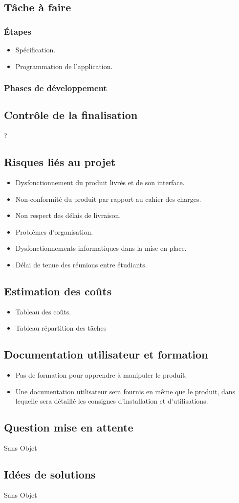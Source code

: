 		\subsection{Tâche à faire}
			\subsubsection{Étapes}
				\begin{itemize}
				\item Spécification.
				\item Programmation de l'application.
				\end{itemize}
			\subsubsection{Phases de développement}
		\subsection{Contrôle de la finalisation}
			?
		\subsection{Risques liés au projet}
			\begin{itemize}
			\item	Dysfonctionnement du produit livrés et de son interface.
			\item	Non-conformité du produit par rapport au cahier des charges.
			\item	Non respect des délais de livraison.
			\item	Problèmes d'organisation.
			\item	Dysfonctionnements informatiques dans la mise en place.
			\item	Délai de tenue des réunions entre étudiants.
			\end{itemize}
			
		\subsection{Estimation des coûts}
			\begin{itemize}
			\item Tableau des coûts.
			\item Tableau répartition des tâches
			\end{itemize}
		\subsection{Documentation utilisateur et formation}
			\begin{itemize}
			\item Pas de formation pour apprendre à manipuler le produit.
			\item Une documentation utilisateur sera fournis en même que le produit, dans lequelle sera détaillé les consignes 					d'installation et d'utilisations.
			\end{itemize}
		\subsection{Question mise en attente}
			Sans Objet
		\subsection{Idées de solutions}
			Sans Objet
		


